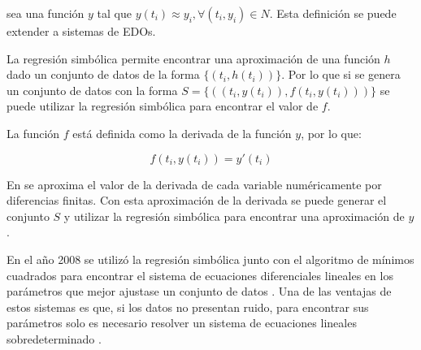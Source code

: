sea una función $y$ tal que $y(t_i) \approx y_i, \forall(t_i, y_i) \in N$. Esta definición se puede extender a sistemas de EDOs.

La regresión simbólica permite encontrar una aproximación de una función $h$ dado un conjunto de datos de la forma $\{(t_i, h(t_i))\}$. Por lo que si se genera un conjunto de datos con la forma $S = \{((t_i, y(t_i)), f(t_i, y(t_i)))\}$ se puede utilizar la regresión simbólica para encontrar el valor de $f$.

La función $f$ está definida como la derivada de la función $y$, por lo que:

$$f(t_i, y(t_i)) = y'(t_i)$$

En \cite{gaucel2014learning, iba2008inference,kronberger2019identification} se aproxima el valor de la derivada de cada variable numéricamente por diferencias finitas. Con esta aproximación de la derivada se puede generar el conjunto $S$ y utilizar la regresión simbólica para encontrar una aproximación de $y$.


En el año 2008 se utilizó la regresión simbólica junto con el algoritmo de mínimos cuadrados para encontrar el sistema de ecuaciones diferenciales lineales en los parámetros que mejor ajustase un conjunto de datos \cite{iba2008inference}. Una de las ventajas de estos sistemas es que, si los datos no presentan ruido, para encontrar sus parámetros solo es necesario resolver un sistema de ecuaciones lineales sobredeterminado \cite{myers2012generalized}.



